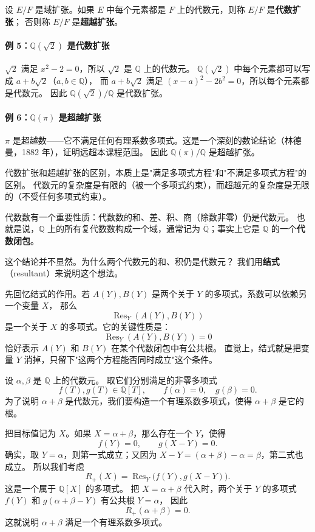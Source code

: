 \begin{definition}[代数扩张与超越扩张]\label{def:algebraic-transcendental-extension}
设 $E/F$ 是域扩张。如果 $E$ 中每个元素都是 $F$ 上的代数元，则称 $E/F$ 是\textbf{代数扩张}；
否则称 $E/F$ 是\textbf{超越扩张}。
\end{definition}

\paragraph*{例 5：$\mathbb{Q}(\sqrt{2})$ 是代数扩张}
$\sqrt{2}$ 满足 $x^2 - 2 = 0$，所以 $\sqrt{2}$ 是 $\mathbb{Q}$ 上的代数元。
$\mathbb{Q}(\sqrt{2})$ 中每个元素都可以写成 $a + b\sqrt{2}$（$a, b \in \mathbb{Q}$），
而 $a + b\sqrt{2}$ 满足 $(x-a)^2 - 2b^2 = 0$，所以每个元素都是代数元。
因此 $\mathbb{Q}(\sqrt{2})/\mathbb{Q}$ 是代数扩张。

\paragraph*{例 6：$\mathbb{Q}(\pi)$ 是超越扩张}
$\pi$ 是超越数——它不满足任何有理系数多项式。这是一个深刻的数论结论（林德曼，1882 年），证明远超本课程范围。
因此 $\mathbb{Q}(\pi)/\mathbb{Q}$ 是超越扩张。

代数扩张和超越扩张的区别，本质上是"满足多项式方程"和"不满足多项式方程"的区别。
代数元的复杂度是有限的（被一个多项式约束），而超越元的复杂度是无限的（不受任何多项式约束）。

代数数有一个重要性质：代数数的和、差、积、商（除数非零）仍是代数元。
也就是说，$\mathbb{Q}$ 上的所有复代数数构成一个域，通常记为 $\overline{\mathbb{Q}}$；事实上它是 $\mathbb{Q}$ 的一个\textbf{代数闭包}。

这个结论并不显然。为什么两个代数元的和、积仍是代数元？
我们用\textbf{结式}（resultant）来说明这个想法。

先回忆结式的作用。若 $A(Y),B(Y)$ 是两个关于 $Y$ 的多项式，系数可以依赖另一个变量 $X$，
那么
\[
\operatorname{Res}_Y(A(Y),B(Y))
\]
是一个关于 $X$ 的多项式。它的关键性质是：
\[
\operatorname{Res}_Y(A(Y),B(Y))=0
\]
恰好表示 $A(Y)$ 和 $B(Y)$ 在某个代数闭包中有公共根。
直觉上，结式就是把变量 $Y$ 消掉，只留下"这两个方程能否同时成立"这个条件。

设 $\alpha,\beta$ 是 $\mathbb{Q}$ 上的代数元。
取它们分别满足的非零多项式
\[
f(T),g(T)\in\mathbb{Q}[T],\qquad f(\alpha)=0,\quad g(\beta)=0.
\]
为了说明 $\alpha+\beta$ 是代数元，我们要构造一个有理系数多项式，使得 $\alpha+\beta$ 是它的根。

把目标值记为 $X$。如果 $X=\alpha+\beta$，那么存在一个 $Y$，使得
\[
f(Y)=0,\qquad g(X-Y)=0.
\]
确实，取 $Y=\alpha$，则第一式成立；又因为 $X-Y=(\alpha+\beta)-\alpha=\beta$，第二式也成立。
所以我们考虑
\[
R_+(X)=\operatorname{Res}_Y\bigl(f(Y),g(X-Y)\bigr).
\]
这是一个属于 $\mathbb{Q}[X]$ 的多项式。
把 $X=\alpha+\beta$ 代入时，两个关于 $Y$ 的多项式 $f(Y)$ 和 $g(\alpha+\beta-Y)$ 有公共根 $Y=\alpha$，
因此
\[
R_+(\alpha+\beta)=0.
\]
这就说明 $\alpha+\beta$ 满足一个有理系数多项式。

